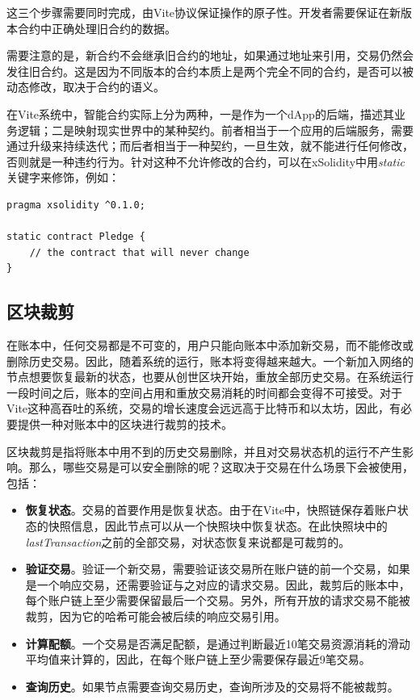 \documentclass[UTF8,nofonts]{ctexart}
\begin{document}
\begin{multicols}{2}
这三个步骤需要同时完成，由Vite协议保证操作的原子性。开发者需要保证在新版本合约中正确处理旧合约的数据。

需要注意的是，新合约不会继承旧合约的地址，如果通过地址来引用，交易仍然会发往旧合约。这是因为不同版本的合约本质上是两个完全不同的合约，是否可以被动态修改，取决于合约的语义。

在Vite系统中，智能合约实际上分为两种，一是作为一个dApp的后端，描述其业务逻辑；二是映射现实世界中的某种契约。前者相当于一个应用的后端服务，需要通过升级来持续迭代；而后者相当于一种契约，一旦生效，就不能进行任何修改，否则就是一种违约行为。针对这种不允许修改的合约，可以在xSolidity中用\textit{static}关键字来修饰，例如：
\begin{verbatim}
pragma xsolidity ^0.1.0;

static contract Pledge {
    // the contract that will never change
}
\end{verbatim}

\subsection{区块裁剪}
在账本中，任何交易都是不可变的，用户只能向账本中添加新交易，而不能修改或删除历史交易。因此，随着系统的运行，账本将变得越来越大。一个新加入网络的节点想要恢复最新的状态，也要从创世区块开始，重放全部历史交易。在系统运行一段时间之后，账本的空间占用和重放交易消耗的时间都会变得不可接受。对于Vite这种高吞吐的系统，交易的增长速度会远远高于比特币和以太坊，因此，有必要提供一种对账本中的区块进行裁剪的技术。

区块裁剪是指将账本中用不到的历史交易删除，并且对交易状态机的运行不产生影响。那么，哪些交易是可以安全删除的呢？这取决于交易在什么场景下会被使用，包括：

\begin{itemize}
\item \textbf{恢复状态}。交易的首要作用是恢复状态。由于在Vite中，快照链保存着账户状态的快照信息，因此节点可以从一个快照块中恢复状态。在此快照块中的\textit{lastTransaction}之前的全部交易，对状态恢复来说都是可裁剪的。
\item \textbf{验证交易}。验证一个新交易，需要验证该交易所在账户链的前一个交易，如果是一个响应交易，还需要验证与之对应的请求交易。因此，裁剪后的账本中，每个账户链上至少需要保留最后一个交易。另外，所有开放的请求交易不能被裁剪，因为它的哈希可能会被后续的响应交易引用。
\item \textbf{计算配额}。一个交易是否满足配额，是通过判断最近10笔交易资源消耗的滑动平均值来计算的，因此，在每个账户链上至少需要保存最近9笔交易。
\item \textbf{查询历史}。如果节点需要查询交易历史，查询所涉及的交易将不能被裁剪。
\end{itemize}


\end{multicols}
\end{document}
